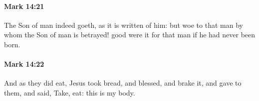 		\paragraph{Mark 14:21} %
			\label{MARK-14-21}

			The Son of man indeed goeth, as it is written of him: but woe to that man by whom the Son of man is betrayed! good were it for that man if he had never been born.

			\begin{framed}
			\scriptsize
				\begin{compactdesc}
					\item[SBLG] 
				\end{compactdesc}
			\end{framed}

		\paragraph{Mark 14:22} %
			\label{MARK-14-22}

			And as they did eat, Jesus took bread, and blessed, and brake it, and gave to them, and said, Take, eat: this is my body.

